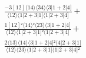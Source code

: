 \documentclass[varwidth, border=5pt]{standalone}
\begin{document}
\begin{my}
$\begin{gathered}
\scriptscriptstyle\frac{-3[12]⟨14⟩⟨34⟩⟨3|1+2|4]}{⟨12⟩⟨1|2+3|1]⟨1|2+3|4]} +\\
\scriptscriptstyle\frac{1[12]²⟨14⟩²⟨23⟩⟨3|1+2|4]}{⟨12⟩⟨1|2+3|1]²⟨1|2+3|4]} +\\
\scriptscriptstyle\frac{2⟨13⟩⟨14⟩⟨3|1+2|4]²⟨4|2+3|1]}{⟨12⟩⟨23⟩⟨1|2+3|1]⟨1|2+3|4]²} \phantom{+}
\end{gathered}$
\end{my}
\end{document}
